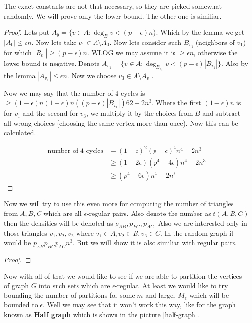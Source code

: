The exact constants are not that necessary, so they are picked somewhat randomly. We will prove only the lower bound. The other one is similiar.

\begin{proof}
	Lets put $A_{0} = \{ v \in A : \deg_{B} v < (p - \epsilon) n\}$. Which by the lemma we get $|A_{0}| \leq \epsilon n$. Now lets take $v_1 \in A \setminus A_{0}$. Now lets consider such $B_{v_1}$ (neighbors of $v_1$) for which $|B_{v_1}| \geq (p - \epsilon) n$. WLOG we may assume it is $\ge \epsilon n$, otherwise the lower bound is negative. Denote $A_{v_1} = \{v \in A  : \deg_{B_{v_1}} v < (p - \epsilon) |B_{v_1}|\}$. Also by the lemma $|A_{v_1}| \leq \epsilon n$. Now we choose $v_3 \in A \setminus A_{v_1}$.
	
	Now we may say that the number of 4-cycles is $\geq (1-\epsilon)n (1 - \epsilon)n ((p - \epsilon) |B_{v_1}|)62 - 2n^3$. Where the first $(1-\epsilon)n$ is for $v_1$ and the second for $v_3$, we multiply it by the choices from $B$ and subtract all wrong choices (choosing the same vertex more than once). Now this can be calculated.
	
	$$
	\begin{aligned}
		\text{number of 4-cycles} & = (1- \epsilon)^2 (p - \epsilon)^4 n^4 - 2n^3 \\
		&\geq (1-2\epsilon) (p^4 - 4\epsilon) n^4 - 2n^3 \\
		&\geq (p^4 - 6\epsilon) n^4 - 2n^3
	\end{aligned}
	$$
\end{proof}

Now we will try to use this even more for computing the number of triangles from $A,B,C$ which are all $\epsilon$-regular pairs. Also denote the number as $t(A,B,C)$ then the densities will be denoted as $p_{AB}, p_{BC}, p_{AC}$. Also we are interested only in those triangles $v_1, v_2, v_3$ where $v_1 \in A, v_2 \in B, v_3 \in C$. In the random graph it would be $p_{AB} p_{BC} p_{AC} n^3$. But we will show it is also similiar with regular pairs.

\begin{lemma}
\end{lemma}

\begin{proof}
\end{proof}

Now with all of that we would like to see if we are able to partition the vertices of graph $G$ into such sets which are $\epsilon$-regular. At least we would like to try bounding the number of partitions for some $m$ and larger $M_\epsilon$ which will be bounded to $\epsilon$. Well we may see that it won't work this way, like for the graph known as \textbf{Half graph} which is shown in the picture \ref{half-graph}.

